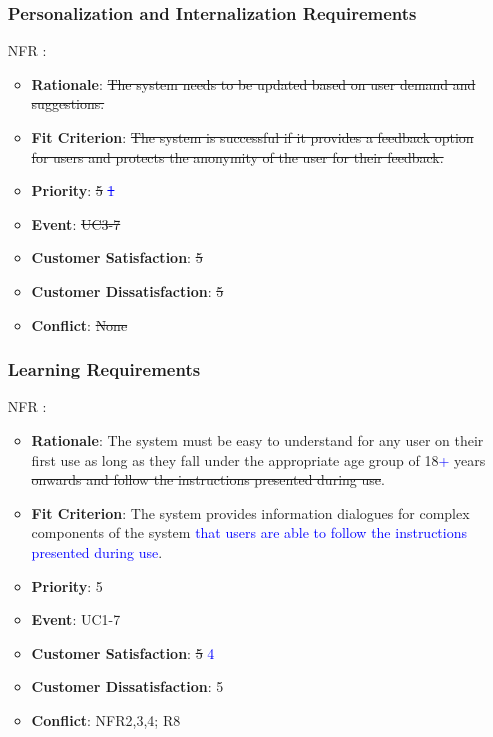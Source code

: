 \documentclass[12pt, titlepage]{article}
\newcounter{reqnum} %
\newcounter{freqnum} %
\begin{document}
\begin{itemize}
\subsubsection{Personalization and Internalization Requirements}

\item[NFR\refstepcounter{freqnum}\thefreqnum
\label{NFR}:] 
\begin{itemize}
    \item \textbf{Rationale}: \sout{The system needs to be updated based on user demand and suggestions.}
    \item \textbf{Fit Criterion}: \sout{The system is successful if it provides a feedback option for users and protects the anonymity of the user for their feedback.}
    \item \textbf{Priority}: \sout{5} \textcolor{blue}{\sout{1}}
    \item \textbf{Event}: \sout{UC3-7}%
    \item \textbf{Customer Satisfaction}: \sout{5}
    \item \textbf{Customer Dissatisfaction}: \sout{5}
    \item \textbf{Conflict}: \sout{None}
\end{itemize}
\subsubsection{Learning Requirements}

\item[NFR\refstepcounter{freqnum}\thefreqnum
\label{NFR}:] 
\begin{itemize}
    \item \textbf{Rationale}: The system must be easy to understand for any user on their first use as long as they fall under the appropriate age group of 18\textcolor{blue}{+} years \sout{onwards and follow the instructions presented during use}.
    \item \textbf{Fit Criterion}: The system provides information dialogues for complex components of the system \textcolor{blue}{that users are able to follow the instructions presented during use}.
    \item \textbf{Priority}: 5
    \item \textbf{Event}: UC1-7 %
    \item \textbf{Customer Satisfaction}: \sout{5} \textcolor{blue}{4}
    \item \textbf{Customer Dissatisfaction}: 5
    \item \textbf{Conflict}: NFR2,3,4; R8
\end{itemize}

\end{itemize}
\end{document}
